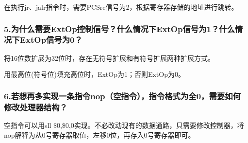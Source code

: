 \documentclass{article}
\begin{document}
            在执行jr、jalr指令时，需要PCSrc信号为2，根据寄存器存储的地址进行跳转。
            \subsubsection*{5.为什么需要ExtOp控制信号？什么情况下ExtOp信号为1？什么情况下ExtOp信号为0？}
            将16位数扩展为32位时，存在无符号扩展和有符号扩展两种扩展方式。

            用最高位(符号位)填充高位时，ExtOp为1；否则ExtOp为0。
            \subsubsection*{6.若想再多实现一条指令nop（空指令），指令格式为全0，需要如何修改处理器结构？}
            空指令可以用sll \$0,\$0,0实现。不必改动现有的数据通路，只需要修改控制器，将nop解释为从0号寄存器取值，左移0位，再存入0号寄存器即可。
\end{document}
